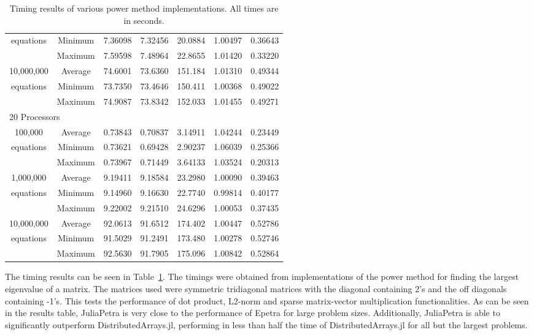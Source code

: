 \documentclass[acmsmall]{acmart}
\begin{document}
\begin{table}
\begin{tabular}{|c c|r|r|r||r|r|}
		equations		&Minimum & 7.36098 & 7.32456 & 20.0884 & 1.00497 & 0.36643 \\
						&Maximum & 7.59598 & 7.48964 & 22.8655 & 1.01420 & 0.33220 \\
	\hline
		10,000,000		&Average & 74.6001 & 73.6360 & 151.184 & 1.01310 & 0.49344 \\
		equations		&Minimum & 73.7350 & 73.4646 & 150.411 & 1.00368 & 0.49022 \\
						&Maximum & 74.9087 & 73.8342 & 152.033 & 1.01455 & 0.49271 \\
	\hline
			\multicolumn{7}{|l|}{20 Processors}\\
	\hline
		100,000			&Average & 0.73843 & 0.70837 & 3.14911 & 1.04244 & 0.23449 \\
		equations		&Minimum & 0.73621 & 0.69428 & 2.90237 & 1.06039 & 0.25366 \\
						&Maximum & 0.73967 & 0.71449 & 3.64133 & 1.03524 & 0.20313 \\
	\hline
		1,000,000		&Average & 9.19411 & 9.18584 & 23.2980 & 1.00090 & 0.39463 \\
		equations		&Minimum & 9.14960 & 9.16630 & 22.7740 & 0.99814 & 0.40177 \\
						&Maximum & 9.22002 & 9.21510 & 24.6296 & 1.00053 & 0.37435 \\
	\hline
		10,000,000		&Average & 92.0613 & 91.6512 & 174.402 & 1.00447 & 0.52786 \\
		equations		&Minimum & 91.5029 & 91.2491 & 173.480 & 1.00278 & 0.52746 \\
						&Maximum & 92.5630 & 91.7905 & 175.096 & 1.00842 & 0.52864 \\
	\hline
\end{tabular}

\caption{Timing results of various power method implementations.  All times are in seconds.}
\label{tab:timing-results}
\end{table}

The timing results can be seen in Table~\ref{tab:timing-results}.
The timings were obtained from implementations of the power method for finding the largest eigenvalue of a matrix.
The matrices used were symmetric tridiagonal matrices with the diagonal containing 2's
and the off diagonals containing -1's.
\cite{PowerMethod}
This tests the performance of dot product, L2-norm and sparse matrix-vector multiplication functionalities.
As can be seen in the results table, JuliaPetra is very close to the performance
of Epetra for large problem sizes.
Additionally, JuliaPetra is able to significantly outperform DistributedArrays.jl, performing in less than
half the time of DistributedArrays.jl for all but the largest problems.
\end{document}

